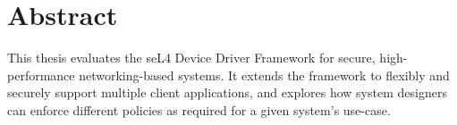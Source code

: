 \chapter{Abstract}\label{ch:abstract}

This thesis evaluates the seL4 Device Driver Framework for secure, high-performance networking-based
systems. It extends the framework to flexibly and securely support multiple client applications, and explores 
how system designers can enforce different policies as required for a given system's use-case. 